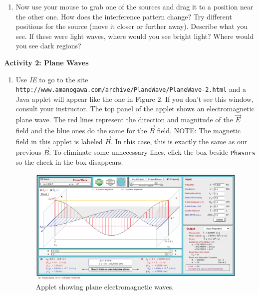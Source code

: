 \begin{enumerate}
\item Now use your mouse to grab one of the sources and drag it to a position
near the other one.
How does the interference pattern change?
Try different positions for the source (move it closer or further away).
Describe what you see.
If these were light waves, where would you see bright light?
Where would you see dark regions?
\vspace{2.0cm}

\end{enumerate}

\textbf{Activity 2: Plane Waves}


\begin{enumerate}

\item  Use {\it IE} to go to the site
{\tt \verb!http://www.amanogawa.com/archive/PlaneWave/PlaneWave-2.html!} and a Java applet will appear 
like the one in Figure 2. 
If you don't see this window, consult your instructor.
The top panel of the applet shows an electromagnetic plane wave.
The red lines represent the direction and magnitude of the $\vec E$ field and the
blue ones do the same for the $\vec B$ field.
NOTE: The magnetic field in this applet is labeled $\vec H$.
In this case, this is exactly the same as our previous $\vec B$.
To eliminate some unnecessary lines, click the box beside {\tt Phasors} so the check in the box 
disappears.
\begin{figure}[hbt]
\begin{center}
\includegraphics[width=5.0in]{plane_waves/plane_wave_screenshot.eps}
\caption{Applet showing plane electromagnetic waves.}
\end{center}
\end{figure}


\end{enumerate}
